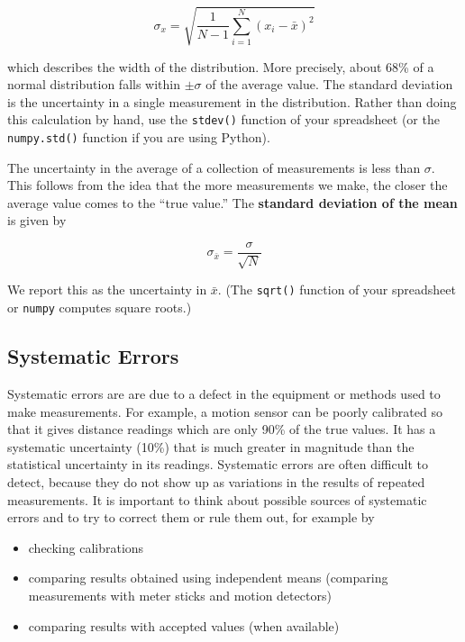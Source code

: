 \documentclass[12pt]{article}
\begin{document}
\begin{equation} 
\sigma_x = \sqrt{\frac{1}{N-1} \sum_{i=1}^N (x_i - \bar{x})^2} 
\end{equation}

\noindent
which describes the width of the distribution. More precisely, about
68\% of a normal distribution falls within $\pm \sigma$ of the average
value. The standard deviation is the uncertainty in a single
measurement in the distribution. Rather than doing this calculation by
hand, use the \texttt{stdev()} function of your spreadsheet (or the 
\texttt{numpy.std()} function if you are using Python).

The uncertainty in the average of a collection of measurements is less
than $\sigma$. This follows from the idea that the more measurements
we make, the closer the average value comes to the ``true value.'' The
\textbf{standard deviation of the mean} is given by 

\begin{equation}
\sigma_{\bar{x}} = \frac{\sigma}{\sqrt{N}} 
\end{equation}

We report this as the uncertainty in $\bar{x}$. (The \texttt{sqrt()} function
of your spreadsheet or \texttt{numpy} computes square roots.)

\subsection*{Systematic Errors}

Systematic errors are are due to a defect in the equipment or methods
used to make measurements. For example, a motion sensor can be poorly
calibrated so that it gives distance readings which are only 90\% of
the true values. It has a systematic uncertainty (10\%) that is much
greater in magnitude than the statistical uncertainty in its
readings. Systematic errors are often difficult to detect, because
they do not show up as variations in the results of repeated
measurements. It is important to think about possible sources of
systematic errors and to try to correct them or rule them out, for
example by 
\begin{itemize}
\item checking calibrations
\item comparing results obtained using independent means (comparing
  measurements with meter sticks and motion detectors)
\item comparing results with accepted values (when available)
\end{itemize}
\end{document}
